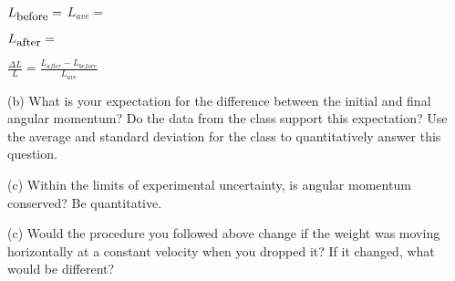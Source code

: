 \( L_{\mbox{\small before}}= \)  \hfill \(L_{ave}=\) \hfill
\vspace{5mm}

\( L_{\mbox{\small after}}= \)
\vspace{5mm}

\( \frac{\Delta L}{L}= \frac{L_{after} - L_{before}}{L_{ave}} \)  
\vspace{10mm}

(b) What is your expectation for the difference between the initial and final angular momentum?
Do the data from the class support this expectation? 
Use the average and standard deviation for the class to quantitatively answer this question.
\vspace{20mm}


(c) Within the limits of experimental uncertainty, is angular momentum 
conserved?  Be quantitative.
\vspace{20mm}

(c) Would the procedure you followed above change if the weight was moving 
horizontally at a constant velocity when you dropped it? 
If it changed, what would be different?
\vspace{20mm}

